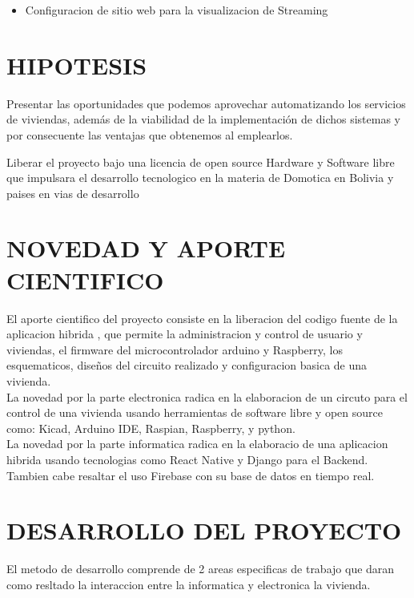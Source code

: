 \documentclass[letterpaper,12pt]{article}
\begin{document}
{\begin{itemize}
	
	\item Configuracion de sitio web para la visualizacion de Streaming 

\end{itemize}




\section{HIPOTESIS}

Presentar las oportunidades que podemos aprovechar automatizando los servicios de viviendas, además de la viabilidad de la implementación de dichos sistemas y por consecuente las ventajas que obtenemos al emplearlos.

Liberar el proyecto bajo una licencia de open source Hardware y Software libre que impulsara el desarrollo tecnologico en la materia de Domotica en Bolivia y paises en vias de desarrollo

\section{NOVEDAD Y APORTE CIENTIFICO}

El aporte cientifico del proyecto consiste en la liberacion del codigo fuente de la aplicacion hibrida , que permite la administracion y control de usuario y viviendas,  el firmware del microcontrolador  arduino y Raspberry, los esquematicos, diseños del circuito realizado y configuracion basica de una vivienda.\\

La novedad por la parte electronica radica en la elaboracion de un circuto para el control de una vivienda usando herramientas de software libre y open source como: Kicad, Arduino IDE, Raspian, Raspberry, y python.\\

La novedad por la parte informatica radica en la elaboracio de una aplicacion hibrida usando tecnologias como React Native y Django para el Backend. Tambien cabe resaltar el uso  Firebase con su base de datos en tiempo real. \\



\section{DESARROLLO DEL PROYECTO}
El metodo de desarrollo comprende de 2 areas especificas de trabajo que daran como resltado la interaccion entre la informatica y electronica la vivienda.


}
\end{document}
